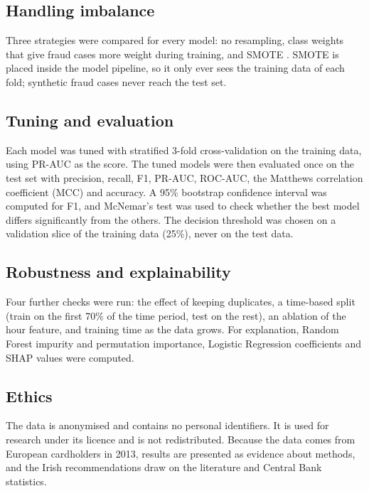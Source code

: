\documentclass[12pt,a4paper]{article}
\begin{document}
\subsection{Handling imbalance}
Three strategies were compared for every model: no resampling, class weights that give fraud cases more weight during training, and SMOTE \citep{chawla2002smote}. SMOTE is placed inside the model pipeline, so it only ever sees the training data of each fold; synthetic fraud cases never reach the test set.

\subsection{Tuning and evaluation}
Each model was tuned with stratified 3-fold cross-validation on the training data, using PR-AUC as the score. The tuned models were then evaluated once on the test set with precision, recall, F1, PR-AUC, ROC-AUC, the Matthews correlation coefficient (MCC) and accuracy. A 95\% bootstrap confidence interval was computed for F1, and McNemar's test \citep{dietterich1998approximate} was used to check whether the best model differs significantly from the others. The decision threshold was chosen on a validation slice of the training data (25\%), never on the test data.

\subsection{Robustness and explainability}
Four further checks were run: the effect of keeping duplicates, a time-based split (train on the first 70\% of the time period, test on the rest), an ablation of the hour feature, and training time as the data grows. For explanation, Random Forest impurity and permutation importance, Logistic Regression coefficients and SHAP values \citep{lundberg2017unified} were computed.

\subsection{Ethics}
The data is anonymised and contains no personal identifiers. It is used for research under its licence and is not redistributed. Because the data comes from European cardholders in 2013, results are presented as evidence about methods, and the Irish recommendations draw on the literature and Central Bank statistics.

\end{document}

